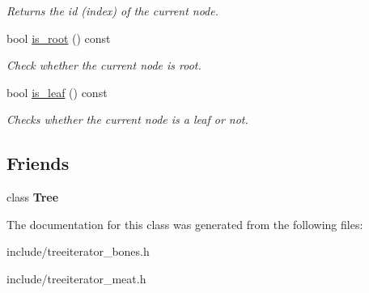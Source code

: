 \begin{DoxyCompactItemize}
\begin{DoxyCompactList}\small\item\em Returns the id (index) of the current node. \end{DoxyCompactList}\item 
bool \hyperlink{classTreeIterator_a641055ff6b66b09cc6b4826e3b826b28}{is\+\_\+root} () const \hypertarget{classTreeIterator_a641055ff6b66b09cc6b4826e3b826b28}{}\label{classTreeIterator_a641055ff6b66b09cc6b4826e3b826b28}

\begin{DoxyCompactList}\small\item\em Check whether the current node is root. \end{DoxyCompactList}\item 
bool \hyperlink{classTreeIterator_a42538b1bf741b30d6bda489f1944d033}{is\+\_\+leaf} () const \hypertarget{classTreeIterator_a42538b1bf741b30d6bda489f1944d033}{}\label{classTreeIterator_a42538b1bf741b30d6bda489f1944d033}

\begin{DoxyCompactList}\small\item\em Checks whether the current node is a leaf or not. \end{DoxyCompactList}\end{DoxyCompactItemize}
\subsection*{Friends}
\begin{DoxyCompactItemize}
\item 
class {\bfseries Tree}\hypertarget{classTreeIterator_a4b682814d14447120dd184fd300deade}{}\label{classTreeIterator_a4b682814d14447120dd184fd300deade}

\end{DoxyCompactItemize}


The documentation for this class was generated from the following files\+:\begin{DoxyCompactItemize}
\item 
include/treeiterator\+\_\+bones.\+h\item 
include/treeiterator\+\_\+meat.\+h\end{DoxyCompactItemize}
